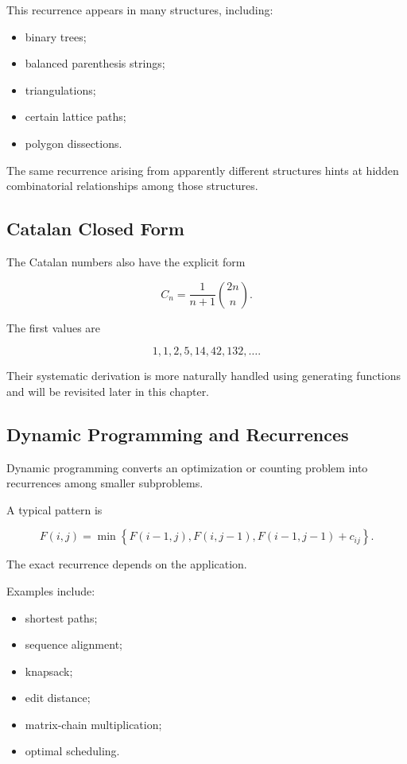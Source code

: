 This recurrence appears in many structures, including:

\begin{itemize}
    \item binary trees;
    \item balanced parenthesis strings;
    \item triangulations;
    \item certain lattice paths;
    \item polygon dissections.
\end{itemize}

The same recurrence arising from apparently different structures hints
at hidden combinatorial relationships among those structures.

\subsection{Catalan Closed Form}
\label{subsec:catalan-closed-form-preview}

The Catalan numbers also have the explicit form

\[
\boxed{
C_n
=
\frac{1}{n+1}
\binom{2n}{n}.
}
\]

The first values are

\[
1,1,2,5,14,42,132,\ldots.
\]

Their systematic derivation is more naturally handled using generating
functions and will be revisited later in this chapter.

\subsection{Dynamic Programming and Recurrences}
\label{subsec:dynamic-programming-recurrences}

Dynamic programming converts an optimization or counting problem into
recurrences among smaller subproblems.

A typical pattern is

\[
\boxed{
F(i,j)
=
\min
\left\{
F(i-1,j),
F(i,j-1),
F(i-1,j-1)+c_{ij}
\right\}.
}
\]

The exact recurrence depends on the application.

Examples include:

\begin{itemize}
    \item shortest paths;
    \item sequence alignment;
    \item knapsack;
    \item edit distance;
    \item matrix-chain multiplication;
    \item optimal scheduling.
\end{itemize}

